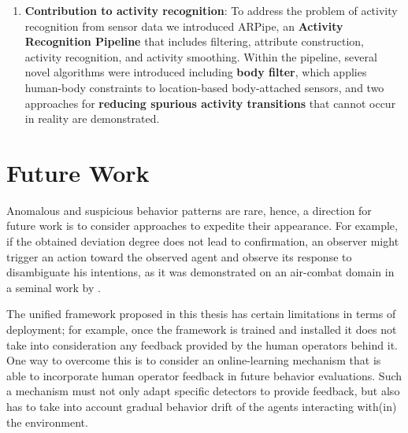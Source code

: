 \begin{enumerate}
	\item \textbf{Contribution to activity recognition}: 
	To address the problem of activity recognition from sensor data we introduced ARPipe, an \textbf{Activity Recognition Pipeline} that includes filtering, attribute construction, activity recognition, and activity smoothing. Within the pipeline, several novel algorithms were introduced including \textbf{body filter}, which applies human-body constraints to location-based body-attached sensors, and two approaches for \textbf{reducing spurious activity transitions} that cannot occur in reality are demonstrated.



\end{enumerate}

\section{Future Work}


Anomalous and suspicious behavior patterns are rare, hence, a direction for future work is to consider approaches to expedite their appearance. For example, if the obtained deviation degree does not lead to confirmation, an observer might trigger an action toward the observed agent and observe its response to disambiguate his intentions, as it was demonstrated on an air-combat domain in a seminal work by \cite{Tambe95a}.

The unified framework proposed in this thesis has certain limitations in terms of deployment; for example, once the framework is trained and installed it does not take into consideration any feedback provided by the human operators behind it. One way to overcome this is to consider an online-learning mechanism that is able to incorporate human operator feedback in future behavior evaluations. Such a mechanism must not only adapt specific detectors to provide feedback, but also has to take into account gradual behavior drift of the agents interacting with(in) the environment. 
\cite{*}


